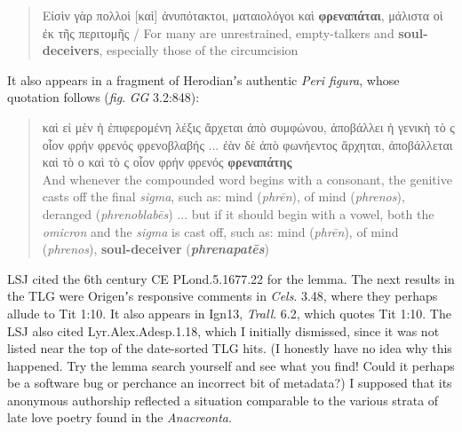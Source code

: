 \begin{quote}Εἰσὶν γὰρ πολλοὶ [καὶ] ἀνυπότακτοι, ματαιολόγοι καὶ \textbf{φρεναπάται}, %
 μάλιστα οἱ ἐκ τῆς περιτομῆς / For many are unrestrained, empty-talkers and \textbf{soul-deceivers}, %
 especially those of the circumcision \end{quote} \clearpage

\noindent{}It also appears in a fragment of Herodianʼs authentic \textit{Peri figura}, %
whose quotation follows (\textit{fig}. \textit{GG} 3.2:848): %

\vspace*{3mm}
 \begin{quote}καὶ εἰ μὲν ἡ ἐπιφερομένη λέξις ἄρχεται ἀπὸ συμφώνου, %
 ἀποβάλλει ἡ γενικὴ τὸ ς οἷον φρήν φρενός φρενοβλαβής %
 ... ἐὰν δὲ ἀπὸ φωνήεντος ἄρχηται, %
 ἀποβάλλεται καὶ τὸ ο καὶ τὸ ς οἷον φρήν φρενός \textbf{φρεναπάτης} \\[1mm] %
 And whenever the compounded word begins with a consonant, %
 the genitive casts off the final \textit{sigma}, such as: %
 mind (\textit{phrēn}), of mind (\textit{phrenos}), deranged (\textit{phrenoblabēs}) ... %
 but if it should begin with a vowel, %
 both the \textit{omicron} and the \textit{sigma} is cast off, %
 such as: mind (\textit{phrēn}), of mind (\textit{phrenos}), \textbf{soul-deceiver} (\textit{\textbf{phrenapatēs}})\end{quote} %
\vspace*{3mm}

LSJ cited the 6th century CE PLond.5.1677.22 for the lemma. %
The next results in the TLG were Origenʼs responsive comments in \textit{Cels}. 3.48, %
where they perhaps allude to Tit 1:10. %
It also appears in Ign13, \textit{Trall}. 6.2, which quotes Tit 1:10. %
The LSJ also cited Lyr.Alex.Adesp.1.18, which I initially dismissed, %
since it was not listed near the top of the date-sorted TLG hits. %
(I honestly have no idea why this happened. Try the lemma search yourself and see what you find! %
Could it perhaps be a software bug or perchance an incorrect bit of metadata?) %
I supposed that its anonymous authorship reflected a situation comparable %
to the various strata of late love poetry found in the \textit{Anacreonta}. %

